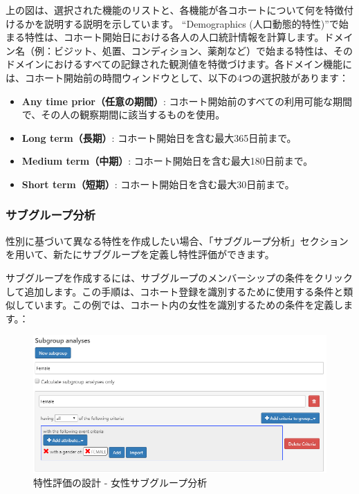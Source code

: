 \documentclass[
  11pt]{book}
\providecommand{\tightlist}{%
  \setlength{\itemsep}{0pt}\setlength{\parskip}{0pt}}
\theoremstyle{definition}
\theoremstyle{definition}
\theoremstyle{definition}
\theoremstyle{definition}
\theoremstyle{remark}
\begin{document}
上の図は、選択された機能のリストと、各機能が各コホートについて何を特徴付けるかを説明する説明を示しています。 ``Demographics (人口動態的特性)''で始まる特性は、コホート開始日における各人の人口統計情報を計算します。ドメイン名（例：ビジット、処置、コンディション、薬剤など）で始まる特性は、そのドメインにおけるすべての記録された観測値を特徴づけます。各ドメイン機能には、コホート開始前の時間ウィンドウとして、以下の4つの選択肢があります：

\begin{itemize}
\tightlist
\item
  \textbf{Any time prior（任意の期間）}: コホート開始前のすべての利用可能な期間で、その人の観察期間に該当するものを使用。
\item
  \textbf{Long term（長期）}: コホート開始日を含む最大365日前まで。
\item
  \textbf{Medium term（中期）}: コホート開始日を含む最大180日前まで。
\item
  \textbf{Short term（短期）}: コホート開始日を含む最大30日前まで。
\end{itemize}

\subsubsection*{サブグループ分析}\label{ux30b5ux30d6ux30b0ux30ebux30fcux30d7ux5206ux6790}

性別に基づいて異なる特性を作成したい場合、「サブグループ分析」セクションを用いて、新たにサブグループを定義し特性評価ができます。

サブグループを作成するには、サブグループのメンバーシップの条件をクリックして追加します。この手順は、コホート登録を識別するために使用する条件と類似しています。この例では、コホート内の女性を識別するための条件を定義します。：

\begin{figure}

{\centering \includegraphics[width=1\linewidth]{images/Characterization/atlasCharacterizationSubgroup} 

}

\caption{特性評価の設計 - 女性サブグループ分析}\label{fig:atlasCharacterizationSubgroup}
\end{figure}
\end{document}
